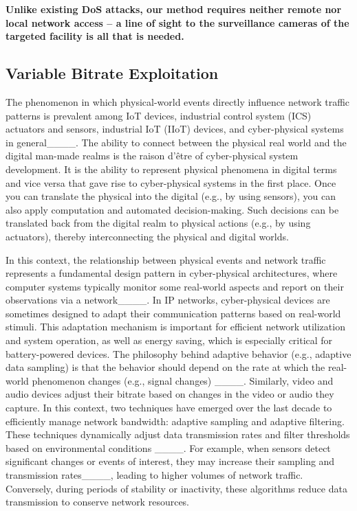 \textbf{Unlike existing DoS attacks, our method requires neither remote nor local network access -- a line of sight to the surveillance cameras of the targeted facility is all that is needed.} 


\subsection{Variable Bitrate Exploitation}

The phenomenon in which physical-world events directly influence network traffic patterns is prevalent among IoT devices, industrial control system (ICS) actuators and sensors, industrial IoT (IIoT) devices, and cyber-physical systems in general____.
The ability to connect between the physical real world and the digital man-made realms is the raison d'être of cyber-physical system development. 
It is the ability to represent physical phenomena in digital terms and vice versa that gave rise to cyber-physical systems in the first place. Once you can translate the physical into the digital (e.g., by using sensors), you can also apply computation and automated decision-making. Such decisions can be translated back from the digital realm to physical actions (e.g., by using actuators), thereby interconnecting the physical and digital worlds.

In this context, the relationship between physical events and network traffic represents a fundamental design pattern in cyber-physical architectures, where computer systems typically monitor some real-world aspects and report on their observations via a network____. 
In IP networks, cyber-physical devices are sometimes designed to adapt their communication patterns based on real-world stimuli. This adaptation mechanism is important for efficient network utilization and system operation, as well as energy saving, which is especially critical for battery-powered devices. The philosophy behind adaptive behavior (e.g., adaptive data sampling) is that the behavior should depend on the rate at which the real-world phenomenon changes (e.g., signal changes) ____. 
Similarly, video and audio devices adjust their bitrate based on changes in the video or audio they capture. 
In this context, two techniques have emerged over the last decade to efficiently manage network bandwidth: adaptive sampling and adaptive filtering. 
These techniques dynamically adjust data transmission rates and filter thresholds based on environmental conditions ____. 
For example, when sensors detect significant changes or events of interest, they may increase their sampling and transmission rates____, leading to higher volumes of network traffic. Conversely, during periods of stability or inactivity, these algorithms reduce data transmission to conserve network resources. 

